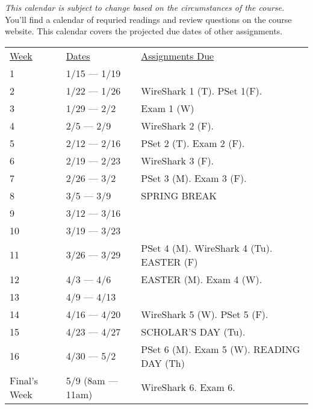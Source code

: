 \documentclass[10pt]{article}
\begin{document}
\textit{This calendar is subject to change based on the circumstances of the course.} You'll find a calendar of requried readings and review questions on the course website. This calendar covers the projected due dates of other assignments.

\begin{center}
\begin{tabular}{lll}
\underline{Week} & \underline{Dates} & \underline{Assignments Due}  \\
1 & 1/15 --- 1/19 &  \\
2 & 1/22 --- 1/26 & WireShark 1 (T). PSet 1(F). \\
3 & 1/29 --- 2/2 & Exam 1 (W)  \\
4 & 2/5 --- 2/9 & WireShark 2 (F).\\
5 & 2/12 --- 2/16 &  PSet 2 (T). Exam 2 (F). \\
6 & 2/19 --- 2/23 & WireShark 3 (F).  \\
7 & 2/26 --- 3/2 &  PSet 3 (M). Exam 3 (F).   \\
8 & 3/5 --- 3/9 & SPRING BREAK \\
9 & 3/12 --- 3/16 &   \\
10 & 3/19 --- 3/23 &   \\
11 & 3/26 --- 3/29 & PSet 4 (M). WireShark 4 (Tu). EASTER (F)    \\
12 & 4/3 --- 4/6 & EASTER (M). Exam 4 (W).   \\
13 & 4/9 --- 4/13 &  \\
14 & 4/16 --- 4/20 &  WireShark 5 (W). PSet 5 (F). \\
15 & 4/23 --- 4/27 & SCHOLAR'S DAY (Tu).     \\
16 & 4/30 --- 5/2 & PSet 6 (M). Exam 5 (W). READING DAY (Th)  \\
Final's Week & 5/9 (8am --- 11am) & WireShark 6. Exam 6.    \\
\end{tabular}
\end{center}
\end{document}
